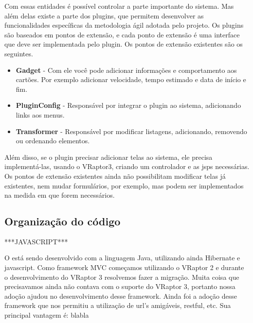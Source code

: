 Com essas entidades é possível controlar a parte importante do sistema. Mas além delas existe a parte dos plugins,
que permitem desenvolver as funcionalidades específicas da metodologia ágil adotada pelo projeto. Os plugins são baseados
em pontos de extensão, e cada ponto de extensão é uma interface que deve ser implementada pelo plugin. Os pontos de extensão
existentes são os seguintes.

\begin{itemize}
	\item{\textbf{Gadget} - Com ele você pode adicionar informações e comportamento aos cartões. Por exemplo adicionar 
		velocidade, tempo estimado e data de início e fim.}
	\item{\textbf{PluginConfig} - Responsável por integrar o plugin ao sistema, adicionando links aos menus.}
	\item{\textbf{Transformer} - Responsável por modificar listagens, adicionando, removendo ou ordenando elementos.}	
\end{itemize}

Além disso, se o plugin precisar adicionar telas ao sistema, ele precisa implementá-las, usando o VRaptor3,
criando um controlador e as jsps necessárias. Os pontos de extensão existentes ainda não possibilitam modificar telas
já existentes, nem mudar formulários, por exemplo, mas podem ser implementados na medida em que forem necessários.

\subsection{Organização do código}


***JAVASCRIPT***


O \calopsita está sendo desenvolvido com a linguagem Java, utilizando ainda Hibernate e javascript. Como 
framework MVC começamos utilizando o VRaptor 2 e durante o desenvolvimento do VRaptor 3 resolvemos fazer a migração. 
Muita coisa que precisavamos ainda não contava com o suporte do VRaptor 3, portanto nossa adoção ajudou no 
desenvolvimento desse framework. Ainda foi a adoção desse framework que nos permitiu a utilização de url's 
amigáveis, restful, etc. Sua principal vantagem é: blabla
